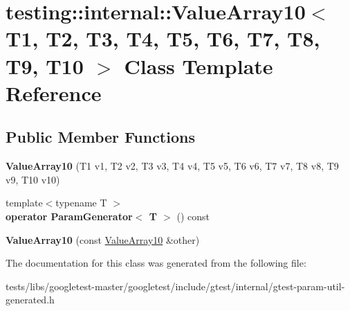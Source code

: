 \hypertarget{classtesting_1_1internal_1_1ValueArray10}{}\section{testing\+:\+:internal\+:\+:Value\+Array10$<$ T1, T2, T3, T4, T5, T6, T7, T8, T9, T10 $>$ Class Template Reference}
\label{classtesting_1_1internal_1_1ValueArray10}
\subsection*{Public Member Functions}
\begin{DoxyCompactItemize}
\item 
\mbox{\label{classtesting_1_1internal_1_1ValueArray10_a763527165bcd1d8e7c366f979b76736b}} 
{\bfseries Value\+Array10} (T1 v1, T2 v2, T3 v3, T4 v4, T5 v5, T6 v6, T7 v7, T8 v8, T9 v9, T10 v10)
\item 
\mbox{\label{classtesting_1_1internal_1_1ValueArray10_afa8855c713997ae82781159f3a3d53fc}} 
{\footnotesize template$<$typename T $>$ }\\{\bfseries operator Param\+Generator$<$ T $>$} () const
\item 
\mbox{\label{classtesting_1_1internal_1_1ValueArray10_a05195c20e50321e51b2502c71c5ec8fa}} 
{\bfseries Value\+Array10} (const \hyperlink{classtesting_1_1internal_1_1ValueArray10}{Value\+Array10} \&other)
\end{DoxyCompactItemize}


The documentation for this class was generated from the following file\+:\begin{DoxyCompactItemize}
\item 
tests/libs/googletest-\/master/googletest/include/gtest/internal/gtest-\/param-\/util-\/generated.\+h\end{DoxyCompactItemize}
